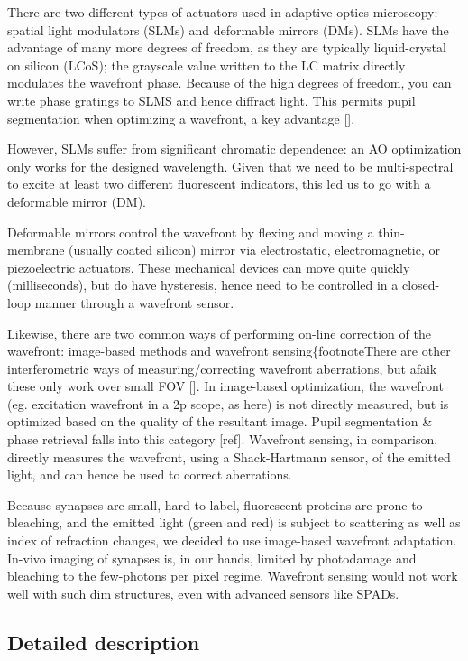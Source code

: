 \documentclass[a4paper,10pt]{article}
\begin{document}
There are two different types of actuators used in adaptive optics microscopy: spatial light modulators (SLMs) and deformable mirrors (DMs).  SLMs have the advantage of many more degrees of freedom, as they are typically liquid-crystal on silicon (LCoS); the grayscale value written to the LC matrix directly modulates the wavefront phase.  Because of the high degrees of freedom, you can write phase gratings to SLMS and hence diffract light.  This permits pupil segmentation when optimizing a wavefront, a key advantage [].  

However, SLMs suffer from significant chromatic dependence: an AO optimization only works for the designed wavelength.  Given that we need to be multi-spectral to excite at least two different fluorescent indicators, this led us to go with a deformable mirror (DM). 

Deformable mirrors control the wavefront by flexing and moving a thin-membrane (usually coated silicon) mirror via electrostatic, electromagnetic, or piezoelectric actuators.  These mechanical devices can move quite quickly (milliseconds), but do have hysteresis, hence need to be controlled in a closed-loop manner through a wavefront sensor.  

Likewise, there are two common ways of performing on-line correction of the wavefront: image-based methods and wavefront sensing\{footnote{There are other interferometric ways of measuring/correcting wavefront aberrations, but afaik these only work over small FOV []}.  In image-based optimization, the wavefront (eg. excitation wavefront in a 2p scope, as here) is not directly measured, but is optimized based on the quality of the resultant image.  Pupil segmentation \& phase retrieval falls into this category [ref].  Wavefront sensing, in comparison, directly measures the wavefront, using a Shack-Hartmann sensor, of the emitted light, and can hence be used to correct aberrations.  

Because synapses are small, hard to label, fluorescent proteins are prone to bleaching, and the emitted light (green and red) is subject to scattering as well as index of refraction changes, we decided to use image-based wavefront adaptation.  In-vivo imaging of synapses is, in our hands, limited by photodamage and bleaching to the few-photons per pixel regime.  Wavefront sensing would not work well with such dim structures, even with advanced sensors like SPADs.  

\subsection{Detailed description}
\end{document}
